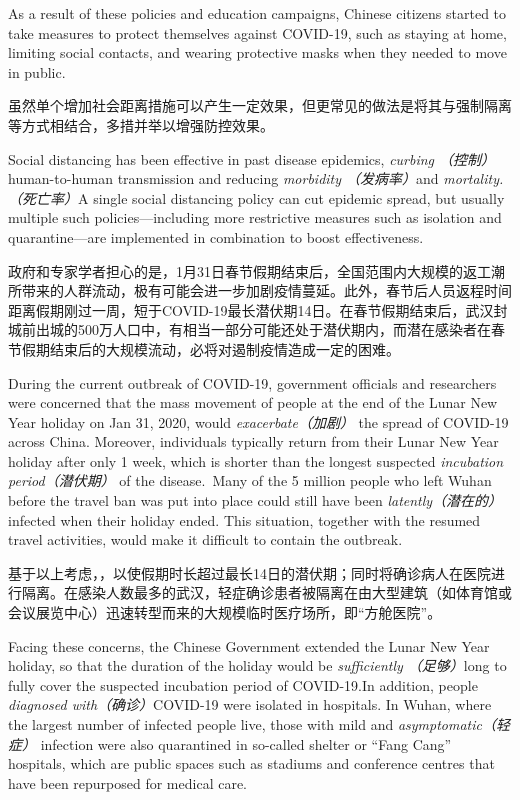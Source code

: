\begin{multicols}{3}
As a result of these policies and education campaigns, Chinese citizens started to take measures to protect themselves against COVID-19, such as staying at home, limiting social contacts, and wearing protective masks when they needed to move in public.

虽然单个增加社会距离措施可以产生一定效果，但更常见的做法是将其与强制隔离等方式相结合，多措并举以增强防控效果。

Social distancing has been effective in past disease epidemics,\textit{ curbing （控制）}human-to-human transmission and reducing \textit{morbidity （发病率）}and \textit{mortality.（死亡率）}A single social distancing policy can cut epidemic spread, but usually multiple such policies---including more restrictive measures such as isolation and quarantine---are implemented in combination to boost effectiveness. 

政府和专家学者担心的是，1月31日春节假期结束后，全国范围内大规模的返工潮所带来的人群流动，极有可能会进一步加剧疫情蔓延。此外，春节后人员返程时间距离假期刚过一周，短于COVID-19最长潜伏期14日。在春节假期结束后，武汉封城前出城的500万人口中，有相当一部分可能还处于潜伏期内，而潜在感染者在春节假期结束后的大规模流动，必将对遏制疫情造成一定的困难。

During the current outbreak of COVID-19, government officials and researchers were concerned that the mass movement of people at the end of the Lunar New Year holiday on Jan 31, 2020, would\textit{ exacerbate（加剧） }the spread of COVID-19 across China. Moreover, individuals typically return from their Lunar New Year holiday after only 1 week, which is shorter than the longest suspected \textit{incubation period（潜伏期） }of the disease.~Many of the 5 million people who left Wuhan before the travel ban was put into place could still have been \textit{latently（潜在的） }infected when their holiday ended. This situation, together with the resumed travel activities, would make it difficult to contain the outbreak.

基于以上考虑，，以使假期时长超过最长14日的潜伏期；同时将确诊病人在医院进行隔离。在感染人数最多的武汉，轻症确诊患者被隔离在由大型建筑（如体育馆或会议展览中心）迅速转型而来的大规模临时医疗场所，即``方舱医院''。

Facing these concerns, the Chinese Government extended the Lunar New Year holiday, so that the duration of the holiday would be \textit{sufficiently （足够）}long to fully cover the suspected incubation period of COVID-19.In addition, people \textit{diagnosed with（确诊）}COVID-19 were isolated in hospitals. In Wuhan, where the largest number of infected people live, those with mild and \textit{asymptomatic（轻症） }infection were also quarantined in so-called shelter or ``Fang Cang'' hospitals, which are public spaces such as stadiums and conference centres that have been repurposed for medical care. 


\end{multicols}
